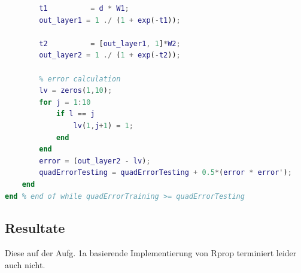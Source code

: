 \documentclass[12pt]{article}
\begin{document}
\begin{lstlisting}[language=Matlab]
        % forward pass
        t1          = d * W1;
        out_layer1 = 1 ./ (1 + exp(-t1));
        
        t2          = [out_layer1, 1]*W2;
        out_layer2 = 1 ./ (1 + exp(-t2));
        
        % error calculation
        lv = zeros(1,10);
        for j = 1:10
            if l == j
                lv(1,j+1) = 1;
            end
        end
        error = (out_layer2 - lv);
        quadErrorTesting = quadErrorTesting + 0.5*(error * error');
    end
end % end of while quadErrorTraining >= quadErrorTesting
\end{lstlisting}

\subsection{Resultate}
Diese auf der Aufg. 1a basierende Implementierung von Rprop terminiert leider auch nicht.
\end{document}
